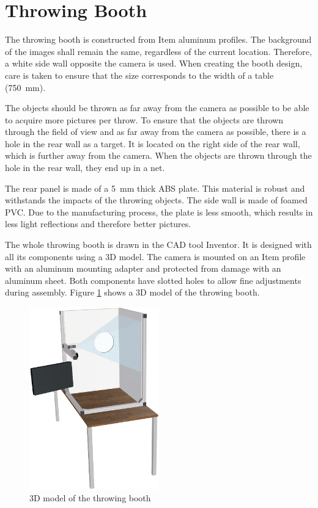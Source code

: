 \section{Throwing Booth}
\label{sec:hardware:throwing_booth}

The throwing booth is constructed from Item aluminum profiles.
The background of the images shall remain the same, regardless of the current location.
Therefore, a white side wall opposite the camera is used.
When creating the booth design, care is taken to ensure that the size corresponds to the width of a table (\SI{750}{mm}).

The objects should be thrown as far away from the camera as possible to be able to acquire more pictures per throw.
To ensure that the objects are thrown through the field of view and as far away from the camera as possible, there is a hole in the rear wall as a target.
It is located on the right side of the rear wall, which is further away from the camera.
When the objects are thrown through the hole in the rear wall, they end up in a net.

The rear panel is made of a \SI{5}{mm} thick ABS plate.
This material is robust and withstands the impacts of the throwing objects.
The side wall is made of foamed PVC.
Due to the manufacturing process, the plate is less smooth, which results in less light reflections and therefore better pictures.

The whole throwing booth is drawn in the CAD tool Inventor. It is designed with all its components using a 3D model.
The camera is mounted on an Item profile with an aluminum mounting adapter and protected from damage with an aluminum sheet.
Both components have slotted holes to allow fine adjustments during assembly.
Figure \ref{fig:booth} shows a 3D model of the throwing booth. 

\begin{figure}[h]
	\centering
	\includegraphics[width=0.5\textwidth]{graphics/top_assembly.png}
	\caption{3D model of the throwing booth}
	\label{fig:booth}
\end{figure}
